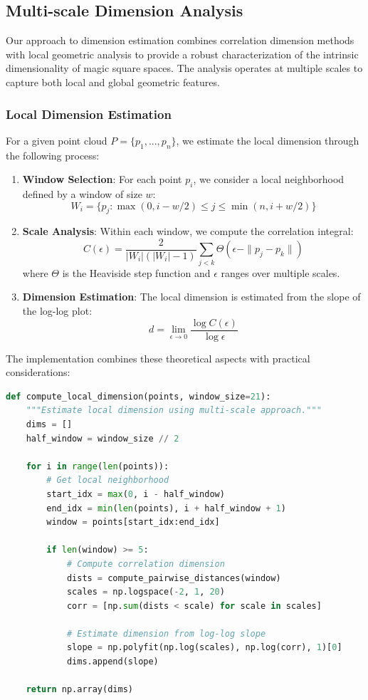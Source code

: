 \subsection{Multi-scale Dimension Analysis}
\label{subsec:dimension}

Our approach to dimension estimation combines correlation dimension methods with local geometric analysis to provide a robust characterization of the intrinsic dimensionality of magic square spaces. The analysis operates at multiple scales to capture both local and global geometric features.

\subsubsection{Local Dimension Estimation}

For a given point cloud $P = \{p_1, ..., p_n\}$, we estimate the local dimension through the following process:

\begin{enumerate}
    \item \textbf{Window Selection}: For each point $p_i$, we consider a local neighborhood defined by a window of size $w$:
    \[
    W_i = \{p_j : \max(0, i-w/2) \leq j \leq \min(n, i+w/2)\}
    \]
    
    \item \textbf{Scale Analysis}: Within each window, we compute the correlation integral:
    \[
    C(\epsilon) = \frac{2}{|W_i|(|W_i|-1)} \sum_{j<k} \Theta(\epsilon - \|p_j - p_k\|)
    \]
    where $\Theta$ is the Heaviside step function and $\epsilon$ ranges over multiple scales.
    
    \item \textbf{Dimension Estimation}: The local dimension is estimated from the slope of the log-log plot:
    \[
    d = \lim_{\epsilon \to 0} \frac{\log C(\epsilon)}{\log \epsilon}
    \]
\end{enumerate}

The implementation combines these theoretical aspects with practical considerations:

\begin{lstlisting}[language=Python, caption=Enhanced Dimension Analysis]
def compute_local_dimension(points, window_size=21):
    """Estimate local dimension using multi-scale approach."""
    dims = []
    half_window = window_size // 2
    
    for i in range(len(points)):
        # Get local neighborhood
        start_idx = max(0, i - half_window)
        end_idx = min(len(points), i + half_window + 1)
        window = points[start_idx:end_idx]
        
        if len(window) >= 5:
            # Compute correlation dimension
            dists = compute_pairwise_distances(window)
            scales = np.logspace(-2, 1, 20)
            corr = [np.sum(dists < scale) for scale in scales]
            
            # Estimate dimension from log-log slope
            slope = np.polyfit(np.log(scales), np.log(corr), 1)[0]
            dims.append(slope)
    
    return np.array(dims)
\end{lstlisting}

